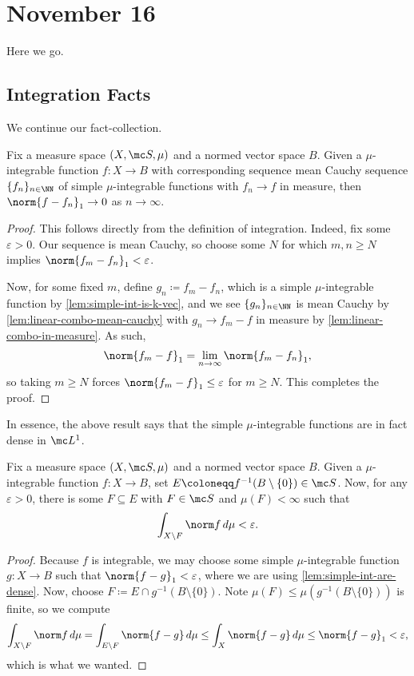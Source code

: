 \documentclass[../notes.tex]{subfiles}
\begin{document}
\section{November 16}

Here we go.

\subsection{Integration Facts}
We continue our fact-collection.
\begin{lemma} \label{lem:simple-int-are-dense}
	Fix a measure space $(X,\mc S,\mu)$ and a normed vector space $B$. Given a $\mu$-integrable function $f\colon X\to B$ with corresponding sequence mean Cauchy sequence $\{f_n\}_{n\in\NN}$ of simple $\mu$-integrable functions with $f_n\to f$ in measure, then $\norm{f-f_n}_1\to0$ as $n\to\infty$.
\end{lemma}
\begin{proof}
	This follows directly from the definition of integration. Indeed, fix some $\varepsilon>0$. Our sequence is mean Cauchy, so choose some $N$ for which $m,n\ge N$ implies $\norm{f_m-f_n}_1<\varepsilon$.
	
	Now, for some fixed $m$, define $g_n\coloneqq f_m-f_n$, which is a simple $\mu$-integrable function by \autoref{lem:simple-int-is-k-vec}, and we see $\{g_n\}_{n\in\NN}$ is mean Cauchy by \autoref{lem:linear-combo-mean-cauchy} with $g_n\to f_m-f$ in measure by \autoref{lem:linear-combo-in-measure}. As such,
	\[\norm{f_m-f}_1=\lim_{n\to\infty}\norm{f_m-f_n}_1,\]
	so taking $m\ge N$ forces $\norm{f_m-f}_1\le\varepsilon$ for $m\ge N$. This completes the proof.
\end{proof}
\begin{remark}
	In essence, the above result says that the simple $\mu$-integrable functions are in fact dense in $\mc L^1$.
\end{remark}
\begin{lemma}
	Fix a measure space $(X,\mc S,\mu)$ and a normed vector space $B$. Given a $\mu$-integrable function $f\colon X\to B$, set $E\coloneqq f^{-1}(B\setminus\{0\})\in\mc S$. Now, for any $\varepsilon>0$, there is some $F\subseteq E$ with $F\in\mc S$ and $\mu(F)<\infty$ such that
	\[\int_{X\setminus F}\norm f\,d\mu<\varepsilon.\]
\end{lemma}
\begin{proof}
	Because $f$ is integrable, we may choose some simple $\mu$-integrable function $g\colon X\to B$ such that $\norm{f-g}_1<\varepsilon$, where we are using \autoref{lem:simple-int-are-dense}. Now, choose $F\coloneqq E\cap g^{-1}(B\setminus\{0\})$. Note $\mu(F)\le\mu\left(g^{-1}(B\setminus\{0\})\right)$ is finite, so we compute
	\[\int_{X\setminus F}\norm f\,d\mu=\int_{E\setminus F}\norm{f-g}\,d\mu\le\int_X\norm{f-g}\,d\mu\le\norm{f-g}_1<\varepsilon,\]
	which is what we wanted.
\end{proof}
\end{document}
